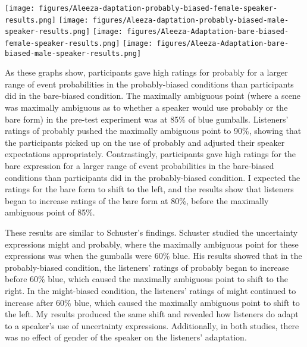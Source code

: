 \documentclass[lucida,biblatex]{sp} %
\begin{document}
\begin{center}
\texttt{[image: figures/Aleeza-daptation-probably-biased-female-speaker-results.png]}
\texttt{[image: figures/Aleeza-daptation-probably-biased-male-speaker-results.png]}
\texttt{[image: figures/Aleeza-Adaptation-bare-biased-female-speaker-results.png]}
\texttt{[image: figures/Aleeza-Adaptation-bare-biased-male-speaker-results.png]}
\vspace{2em}
\end{center}
As these graphs show, participants gave high ratings for probably for a larger range of event probabilities in the probably-biased conditions than participants did in the bare-biased condition. The maximally ambiguous point (where a scene was maximally ambiguous as to whether a speaker would use probably or the bare form) in the pre-test experiment was at 85\% of blue gumballs. Listeners’ ratings of probably pushed the maximally ambiguous point to 90\%, showing that the participants picked up on the use of probably and adjusted their speaker expectations appropriately. Contrastingly, participants gave high ratings for the bare expression for a larger range of event probabilities in the bare-biased conditions than participants did in the probably-biased condition. I expected the ratings for the bare form to shift to the left, and the results show that listeners began to increase ratings of the bare form at 80\%, before the maximally ambiguous point of 85\%. 

These results are similar to Schuster’s findings. Schuster studied the uncertainty expressions might and probably, where the maximally ambiguous point for these expressions was when the gumballs were 60\% blue. His results showed that in the probably-biased condition, the listeners’ ratings of probably began to increase before 60\% blue, which caused the maximally ambiguous point to shift to the right. In the might-biased condition, the listeners’ ratings of might continued to increase after 60\% blue, which caused the maximally ambiguous point to shift to the left. My results produced the same shift and revealed how listeners do adapt to a speaker’s use of uncertainty expressions. Additionally, in both studies, there was no effect of gender of the speaker on the listeners’ adaptation. 
\end{document}
